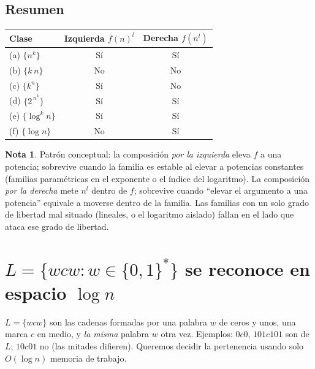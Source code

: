 \documentclass[11pt,a4paper]{article}
\theoremstyle{plain}
\theoremstyle{definition}
\newtheorem*{nota}{Nota}
\begin{document}
\subsection*{Resumen}

\begin{center}
\renewcommand{\arraystretch}{1.35}
\begin{tabular}{|l|c|c|}
\hline
\textbf{Clase} & \textbf{Izquierda} $f(n)^{l}$ & \textbf{Derecha} $f(n^{l})$\\
\hline
(a) $\{n^{k}\}$        & S\'i & S\'i \\
(b) $\{k\,n\}$         & No   & No   \\
(c) $\{k^{n}\}$        & S\'i & No   \\
(d) $\{2^{\,n^{k}}\}$  & S\'i & S\'i \\
(e) $\{\log^{k} n\}$   & S\'i & S\'i \\
(f) $\{\log n\}$       & No   & S\'i \\
\hline
\end{tabular}
\end{center}

\begin{nota}
Patr\'on conceptual: la composici\'on \emph{por la izquierda} eleva $f$ a una
potencia; sobrevive cuando la familia es estable al elevar a potencias constantes
(familias param\'etricas en el exponente o el \'indice del logaritmo). La composici\'on
\emph{por la derecha} mete $n^l$ dentro de $f$; sobrevive cuando ``elevar el argumento
a una potencia'' equivale a moverse dentro de la familia. Las familias con un solo
grado de libertad mal situado (lineales, o el logaritmo aislado) fallan en el lado que
ataca ese grado de libertad.
\end{nota}

\section{$L=\{wcw : w\in\{0,1\}^{*}\}$ se reconoce en espacio $\log n$}

\begin{concepto}
$L=\{wcw\}$ son las cadenas formadas por una palabra $w$ de ceros y unos, una marca
$c$ en medio, y \emph{la misma} palabra $w$ otra vez. Ejemplos: $0c0$, $101c101$ son
de $L$; $10c01$ no (las mitades difieren). Queremos decidir la pertenencia usando
solo $O(\log n)$ memoria de trabajo.
\end{concepto}
\end{document}
